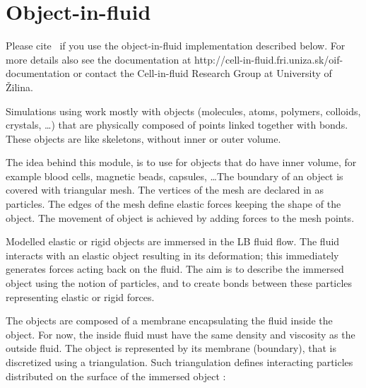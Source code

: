%  
%   
%  
%  
%

\chapter{Object-in-fluid}
\label{sec:oif}

\begin{citebox}
  Please cite~ if you use the object-in-fluid implementation described below. For more details also see the documentation at http://cell-in-fluid.fri.uniza.sk/oif-documentation or contact the Cell-in-fluid Research Group at University of \v Zilina.
\end{citebox}

Simulations using \es work mostly with objects (molecules, atoms, polymers, colloids, crystals, \dots) that are physically composed of points linked together with bonds. These objects are like skeletons, without inner or outer volume. 

The idea behind this module, is to use \es for objects that do have inner volume, for example blood cells, magnetic beads, capsules, \dots The boundary of an object is covered with triangular mesh. The vertices of the mesh are declared in \es as particles. The edges of the mesh define elastic forces keeping the shape of the object. The movement of object is achieved by adding forces to the mesh points.

Modelled elastic or rigid objects are immersed in the LB fluid flow. The fluid interacts with an elastic object resulting in its deformation; this immediately generates forces acting back on the fluid. The aim is to describe the immersed object using the notion of particles, and to create bonds between these particles representing elastic or rigid forces.

The objects are composed of a membrane encapsulating the fluid inside the object. For now, the inside fluid must have the same density and viscosity as the outside fluid. The object is represented by its membrane (boundary), that is discretized using a triangulation. Such triangulation defines interacting particles distributed on the surface of the immersed object \cite{dupin07}:

